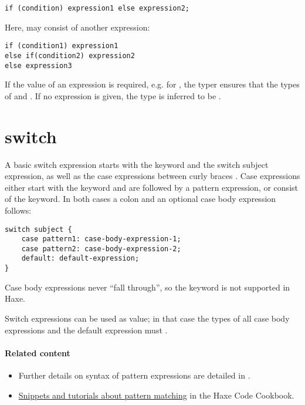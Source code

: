 \begin{lstlisting}
if (condition) expression1 else expression2;
\end{lstlisting}

Here,  may consist of another  expression:

\begin{lstlisting}
if (condition1) expression1
else if(condition2) expression2
else expression3
\end{lstlisting}

If the value of an  expression is required, e.g. for , the typer ensures that the types of  and  . If no  expression is given, the type is inferred to be .


\section{switch}
\label{expression-switch}

A basic switch expression starts with the  keyword and the switch subject expression, as well as the case expressions between curly braces \expr{\{\}}. Case expressions either start with the  keyword and are followed by a pattern expression, or consist of the  keyword. In both cases a colon \expr{:} and an optional case body expression follows:

\begin{lstlisting}
switch subject {
	case pattern1: case-body-expression-1;
	case pattern2: case-body-expression-2;
	default: default-expression;
}
\end{lstlisting}

Case body expressions never ``fall through'', so the  keyword is not supported in Haxe.

Switch expressions can be used as value; in that case the types of all case body expressions and the default expression must .

\paragraph{Related content}
\begin{itemize}
	\item Further details on syntax of pattern expressions are detailed in .
	\item \href{http://code.haxe.org/tag/pattern-matching.html}{Snippets and tutorials about pattern matching} in the Haxe Code Cookbook.
\end{itemize}


